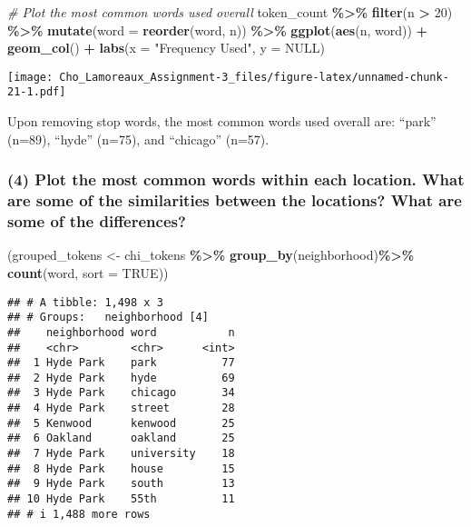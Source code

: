 \documentclass[
]{article}
\newenvironment{Shaded}{\begin{snugshade}}{\end{snugshade}}
\newcommand{\AttributeTok}[1]{\textcolor[rgb]{0.13,0.29,0.53}{#1}}
\newcommand{\CommentTok}[1]{\textcolor[rgb]{0.56,0.35,0.01}{\textit{#1}}}
\newcommand{\ConstantTok}[1]{\textcolor[rgb]{0.56,0.35,0.01}{#1}}
\newcommand{\DecValTok}[1]{\textcolor[rgb]{0.00,0.00,0.81}{#1}}
\newcommand{\FunctionTok}[1]{\textcolor[rgb]{0.13,0.29,0.53}{\textbf{#1}}}
\newcommand{\NormalTok}[1]{#1}
\newcommand{\OtherTok}[1]{\textcolor[rgb]{0.56,0.35,0.01}{#1}}
\newcommand{\SpecialCharTok}[1]{\textcolor[rgb]{0.81,0.36,0.00}{\textbf{#1}}}
\newcommand{\StringTok}[1]{\textcolor[rgb]{0.31,0.60,0.02}{#1}}
\begin{document}
\begin{Shaded}
\begin{Highlighting}[]
\CommentTok{\# Plot the most common words used overall}
\NormalTok{token\_count }\SpecialCharTok{\%\textgreater{}\%}
  \FunctionTok{filter}\NormalTok{(n }\SpecialCharTok{\textgreater{}} \DecValTok{20}\NormalTok{) }\SpecialCharTok{\%\textgreater{}\%}
  \FunctionTok{mutate}\NormalTok{(}\AttributeTok{word =} \FunctionTok{reorder}\NormalTok{(word, n)) }\SpecialCharTok{\%\textgreater{}\%}
  \FunctionTok{ggplot}\NormalTok{(}\FunctionTok{aes}\NormalTok{(n, word)) }\SpecialCharTok{+}
  \FunctionTok{geom\_col}\NormalTok{() }\SpecialCharTok{+}
  \FunctionTok{labs}\NormalTok{(}\AttributeTok{x =} \StringTok{"Frequency Used"}\NormalTok{, }\AttributeTok{y =} \ConstantTok{NULL}\NormalTok{)}
\end{Highlighting}
\end{Shaded}

\texttt{[image: Cho\_Lamoreaux\_Assignment-3\_files/figure-latex/unnamed-chunk-21-1.pdf]}

Upon removing stop words, the most common words used overall are:
``park'' (n=89), ``hyde'' (n=75), and ``chicago'' (n=57).

\hypertarget{plot-the-most-common-words-within-each-location.-what-are-some-of-the-similarities-between-the-locations-what-are-some-of-the-differences}{%
\subsubsection{(4) Plot the most common words within each location. What
are some of the similarities between the locations? What are some of the
differences?}\label{plot-the-most-common-words-within-each-location.-what-are-some-of-the-similarities-between-the-locations-what-are-some-of-the-differences}}

\begin{Shaded}
\begin{Highlighting}[]
\NormalTok{(grouped\_tokens }\OtherTok{\textless{}{-}}\NormalTok{ chi\_tokens }\SpecialCharTok{\%\textgreater{}\%}
  \FunctionTok{group\_by}\NormalTok{(neighborhood)}\SpecialCharTok{\%\textgreater{}\%}
  \FunctionTok{count}\NormalTok{(word, }\AttributeTok{sort =} \ConstantTok{TRUE}\NormalTok{))}
\end{Highlighting}
\end{Shaded}

\begin{verbatim}
## # A tibble: 1,498 x 3
## # Groups:   neighborhood [4]
##    neighborhood word           n
##    <chr>        <chr>      <int>
##  1 Hyde Park    park          77
##  2 Hyde Park    hyde          69
##  3 Hyde Park    chicago       34
##  4 Hyde Park    street        28
##  5 Kenwood      kenwood       25
##  6 Oakland      oakland       25
##  7 Hyde Park    university    18
##  8 Hyde Park    house         15
##  9 Hyde Park    south         13
## 10 Hyde Park    55th          11
## # i 1,488 more rows
\end{verbatim}
\end{document}
